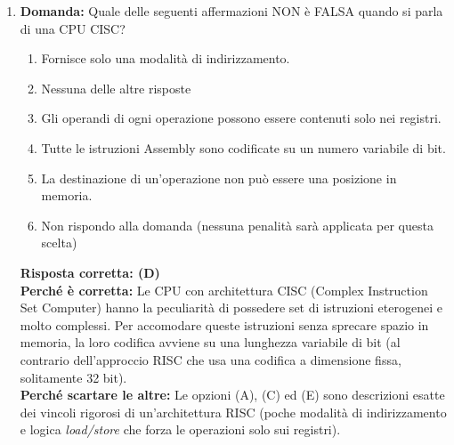 \documentclass[12pt, a4paper]{article}
\begin{document}
\begin{enumerate}
    \item \textbf{Domanda:} Quale delle seguenti affermazioni NON è FALSA quando si parla di una CPU CISC?
    \begin{enumerate}[label=(\Alph*)]
        \item Fornisce solo una modalità di indirizzamento.
        \item Nessuna delle altre risposte
        \item Gli operandi di ogni operazione possono essere contenuti solo nei registri.
        \item Tutte le istruzioni Assembly sono codificate su un numero variabile di bit.
        \item La destinazione di un'operazione non può essere una posizione in memoria.
        \item Non rispondo alla domanda (nessuna penalità sarà applicata per questa scelta)
    \end{enumerate}
    \textbf{Risposta corretta: (D)} \\
    \textbf{Perché è corretta:} Le CPU con architettura CISC (Complex Instruction Set Computer) hanno la peculiarità di possedere set di istruzioni eterogenei e molto complessi. Per accomodare queste istruzioni senza sprecare spazio in memoria, la loro codifica avviene su una lunghezza variabile di bit (al contrario dell'approccio RISC che usa una codifica a dimensione fissa, solitamente 32 bit). \\
    \textbf{Perché scartare le altre:} Le opzioni (A), (C) ed (E) sono descrizioni esatte dei vincoli rigorosi di un'architettura RISC (poche modalità di indirizzamento e logica \textit{load/store} che forza le operazioni solo sui registri).
    

\end{enumerate}
\end{document}
